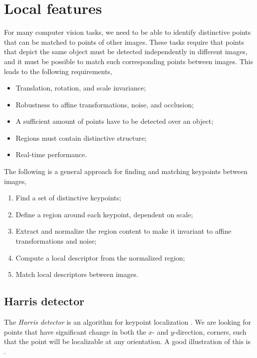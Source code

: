 \section{Local features}

For many computer vision tasks, we need to be able to identify distinctive
points that can be matched to points of other images.
These tasks require that points that depict the same object must be detected
independently in different images, and it must be possible to match such
corresponding points between images. This leads to the following requirements,
\begin{itemize}
    \item Translation, rotation, and scale invariance;
    \item Robustness to affine transformations, noise, and occlusion;
    \item A sufficient amount of points have to be detected over an object;
    \item Regions must contain distinctive structure;
    \item Real-time performance.
\end{itemize}

The following is a general approach for finding and matching keypoints between
images,
\begin{enumerate}
    \item Find a set of distinctive keypoints;
    \item Define a region around each keypoint, dependent on scale;
    \item Extract and normalize the region content to make it invariant to
          affine transformations and noise;
    \item Compute a local descriptor from the normalized region;
    \item Match local descriptors between images.
\end{enumerate}

\subsection{Harris detector}

The \textit{Harris detector} is an algorithm for keypoint localization
\citep{harris1988combined}. We are looking for points that have significant
change in both the $x$- and $y$-direction, \ie corners, such that the point
will be localizable at any orientation. A good illustration of this is
.

